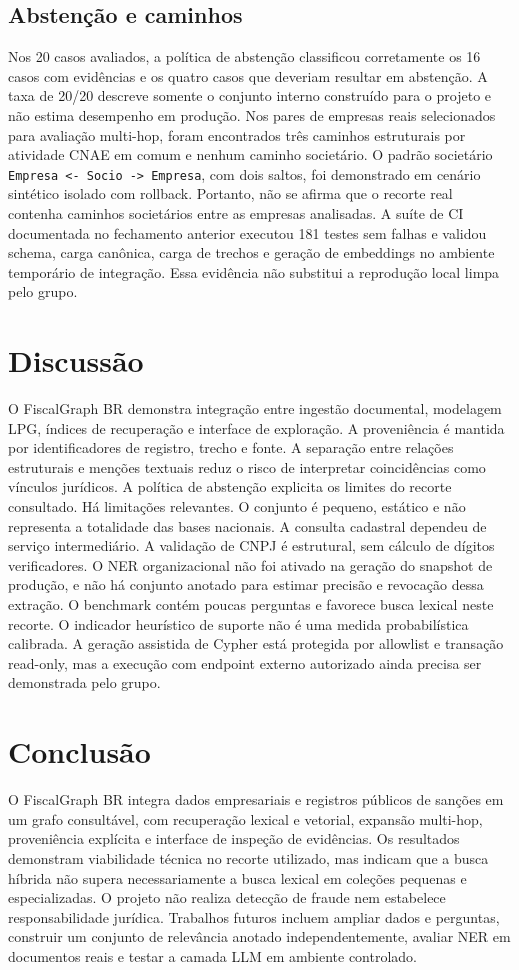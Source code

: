 \documentclass[conference]{IEEEtran}
\begin{document}
\subsection{Abstenção e caminhos}
Nos 20 casos avaliados, a política de abstenção classificou corretamente os 16 casos com evidências e os quatro casos que deveriam resultar em abstenção. A taxa de 20/20 descreve somente o conjunto interno construído para o projeto e não estima desempenho em produção.
Nos pares de empresas reais selecionados para avaliação multi-hop, foram encontrados três caminhos estruturais por atividade CNAE em comum e nenhum caminho societário. O padrão societário \texttt{Empresa <- Socio -> Empresa}, com dois saltos, foi demonstrado em cenário sintético isolado com rollback. Portanto, não se afirma que o recorte real contenha caminhos societários entre as empresas analisadas.
A suíte de CI documentada no fechamento anterior executou 181 testes sem falhas e validou schema, carga canônica, carga de trechos e geração de embeddings no ambiente temporário de integração. Essa evidência não substitui a reprodução local limpa pelo grupo.
\section{Discussão}
O FiscalGraph BR demonstra integração entre ingestão documental, modelagem LPG, índices de recuperação e interface de exploração. A proveniência é mantida por identificadores de registro, trecho e fonte. A separação entre relações estruturais e menções textuais reduz o risco de interpretar coincidências como vínculos jurídicos. A política de abstenção explicita os limites do recorte consultado.
Há limitações relevantes. O conjunto é pequeno, estático e não representa a totalidade das bases nacionais. A consulta cadastral dependeu de serviço intermediário. A validação de CNPJ é estrutural, sem cálculo de dígitos verificadores. O NER organizacional não foi ativado na geração do snapshot de produção, e não há conjunto anotado para estimar precisão e revocação dessa extração. O benchmark contém poucas perguntas e favorece busca lexical neste recorte. O indicador heurístico de suporte não é uma medida probabilística calibrada. A geração assistida de Cypher está protegida por allowlist e transação read-only, mas a execução com endpoint externo autorizado ainda precisa ser demonstrada pelo grupo.
\section{Conclusão}
O FiscalGraph BR integra dados empresariais e registros públicos de sanções em um grafo consultável, com recuperação lexical e vetorial, expansão multi-hop, proveniência explícita e interface de inspeção de evidências. Os resultados demonstram viabilidade técnica no recorte utilizado, mas indicam que a busca híbrida não supera necessariamente a busca lexical em coleções pequenas e especializadas. O projeto não realiza detecção de fraude nem estabelece responsabilidade jurídica. Trabalhos futuros incluem ampliar dados e perguntas, construir um conjunto de relevância anotado independentemente, avaliar NER em documentos reais e testar a camada LLM em ambiente controlado.


\end{document}

